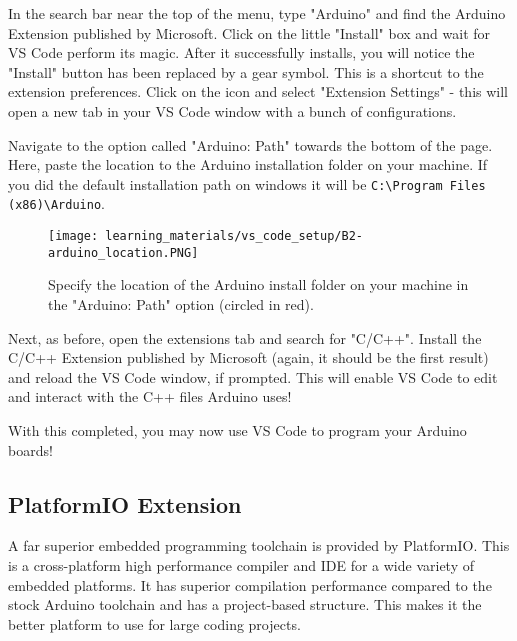     In the search bar near the top of the menu, type "Arduino" and find the Arduino Extension published by Microsoft. 
    Click on the little "Install" box and wait for VS Code perform its magic.
    After it successfully installs, you will notice the "Install" button has been replaced by a gear symbol.
    This is a shortcut to the extension preferences.
    Click on the icon and select "Extension Settings" - this will open a new tab in your VS Code window with a bunch of configurations.

    Navigate to the option called "Arduino: Path" towards the bottom of the page.
    Here, paste the location to the Arduino installation folder on your machine.
    If you did the default installation path on windows it will be \lstinline[]{C:\Program Files (x86)\Arduino}.


    \begin{figure}[h!]
        \texttt{[image: learning\_materials/vs\_code\_setup/B2-arduino\_location.PNG]}
        \caption[VS Code Arduino Location]{Specify the location of the Arduino install folder on your machine in the "Arduino: Path" option (circled in red).}
    \end{figure}

    Next, as before, open the extensions tab and search for "C/C++".
    Install the C/C++ Extension published by Microsoft (again, it should be the first result) and reload the VS Code window, if prompted.
    This will enable VS Code to edit and interact with the C++ files Arduino uses!

    With this completed, you may now use VS Code to program your Arduino boards!

    \subsection*{PlatformIO Extension}
    A far superior embedded programming toolchain is provided by PlatformIO.
    This is a cross-platform high performance compiler and IDE for a wide variety of embedded platforms.
    It has superior compilation performance compared to the stock Arduino toolchain and has a project-based structure. This makes it the better platform to use for large coding projects.
    
